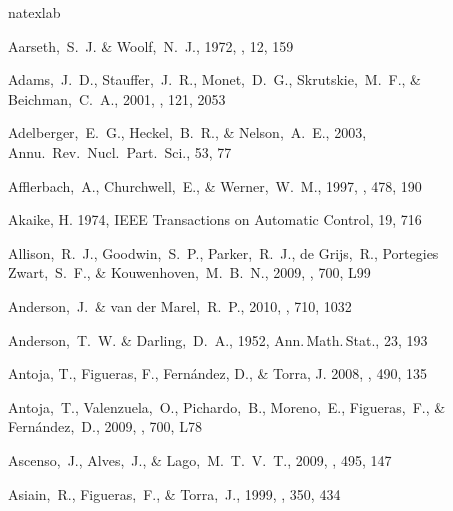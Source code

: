 \begin{thebibliography}{99}

\expandafter\ifx\csname natexlab\endcsname\relax\def\natexlab#1{#1}\fi

  Aarseth,~S.~J. \& Woolf,~N.~J., 1972,
  \aplett, 12, 159

  Adams,~J.~D., Stauffer,~J.~R., Monet,~D.~G., Skrutskie,~M.~F., \& Beichman,~C.~A., 2001,
  \aj, 121, 2053

  Adelberger,~E.~G., Heckel,~B.~R., \& Nelson,~A.~E., 2003,
  Annu.~Rev.~Nucl.~Part.~Sci., 53, 77

  Afflerbach,~A., Churchwell,~E., \& Werner,~W.~M., 1997,
  \apj, 478, 190

{Akaike}, H. 1974, {IEEE Transactions on Automatic Control}, 19, 716

  Allison,~R.~J., Goodwin,~S.~P., Parker,~R.~J., de Grijs,~R., Portegies Zwart,~S.~F., \& Kouwenhoven,~M.~B.~N., 2009,
  \apjl, 700, L99

  Anderson,~J.~\& van der Marel,~R.~P., 2010, \apj, 710, 1032

  Anderson,~T.~W. \& Darling,~D.~A., 1952,
  Ann.\,Math.\,Stat., 23, 193

{Antoja}, T., {Figueras}, F., {Fern{\'a}ndez}, D., \& {Torra}, J. 2008, \aap,
  490, 135

  Antoja,~T., Valenzuela,~O., Pichardo,~B., Moreno,~E., Figueras,~F., \& Fern{\'a}ndez,~D., 2009,
  \apjl, 700, L78

  Ascenso,~J., Alves,~J., \& Lago,~M.~T.~V.~T., 2009,
  \aap, 495, 147

  Asiain,~R., Figueras,~F., \& Torra,~J., 1999,
  \aap, 350, 434


\end{thebibliography}

